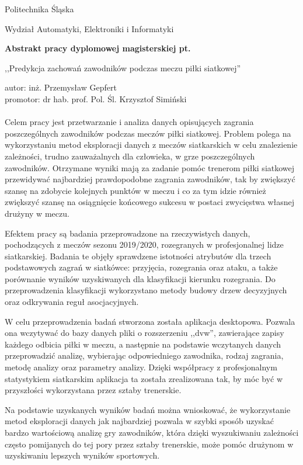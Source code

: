 \documentclass[12pt, letterpaper]{article}
\begin{document}
\begin{center}
Politechnika Śląska

Wydział Automatyki, Elektroniki i Informatyki\break

\textbf{Abstrakt pracy dyplomowej magisterskiej pt.}

,,Predykcja zachowań zawodników podczas meczu piłki siatkowej''
\end{center}
autor: inż. Przemysław Gepfert\\
promotor: dr hab. prof. Pol. Śl. Krzysztof Simiński\\\\

Celem pracy jest przetwarzanie i analiza danych opisujących zagrania poszczególnych zawodników podczas meczów piłki siatkowej. Problem polega na wykorzystaniu metod eksploracji danych z meczów siatkarskich w celu znalezienie zależności, trudno zauważalnych dla człowieka, w grze poszczególnych zawodników. Otrzymane wyniki mają za zadanie pomóc trenerom piłki siatkowej przewidywać najbardziej prawdopodobne zagrania zawodników, tak by zwiększyć szansę na zdobycie kolejnych punktów w meczu i co za tym idzie również zwiększyć szansę na osiągnięcie końcowego sukcesu w postaci zwycięstwa własnej drużyny w meczu. 

Efektem pracy są badania przeprowadzone na rzeczywistych danych, pochodzących z meczów sezonu 2019/2020, rozegranych w profesjonalnej lidze siatkarskiej. 
Badania te objęły sprawdzene istotności atrybutów dla trzech podstawowych zagrań w siatkówce: przyjęcia, rozegrania oraz ataku, a także porównanie wyników uzyskiwanych dla klasyfikacji kierunku rozegrania. Do przeprowadzenia klasyfikacji wykorzystano metody budowy drzew decyzyjnych oraz odkrywania reguł asocjacyjnych.

W celu przeprowadzenia badań stworzona została aplikacja desktopowa. Pozwala ona wczytywać do bazy danych pliki o rozszerzeniu ,,dvw'', zawierające zapisy każdego odbicia piłki w meczu, a następnie na podstawie wczytanych danych przeprowadzić analizę, wybierając odpowiedniego zawodnika, rodzaj zagrania, metodę analizy oraz parametry analizy. Dzięki współpracy z profesjonalnym statystykiem siatkarskim aplikacja ta została zrealizowana tak, by móc być w przyszłości wykorzystana przez sztaby trenerskie.

Na podstawie uzyskanych wyników badań można wnioskować, że wykorzystanie metod eksploracji danych jak najbardziej pozwala w szybki sposób uzyskać bardzo wartościową analizę gry zawodników, która dzięki wyszukiwaniu zależności często pomijanych do tej pory przez sztaby
trenerskie, może pomóc drużynom w uzyskiwaniu lepszych wyników sportowych.
\end{document}

